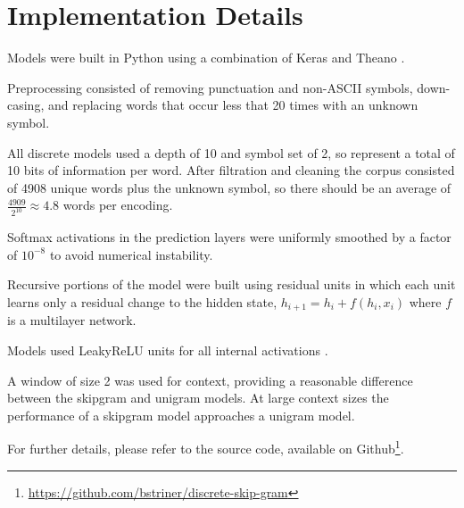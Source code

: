 \documentclass[sigconf]{acmart}
\begin{document}
\section{Implementation Details}

Models were built in Python using a combination of Keras \cite{chollet2015keras} and Theano \cite{2016arXiv160502688short}.

Preprocessing consisted of removing punctuation and non-ASCII symbols, down-casing, and replacing words that occur less that 20 times with an unknown symbol.

All discrete models used a depth of 10 and symbol set of 2, so represent a total of 10 bits of information per word. After filtration and cleaning the corpus consisted of 4908 unique words plus the unknown symbol, so there should be an average of $\frac{4909}{2^{10}} \approx 4.8$ words per encoding.

Softmax activations in the prediction layers were uniformly smoothed by a factor of $10^{-8}$ to avoid numerical instability.

Recursive portions of the model were built using residual units \cite{DBLP:journals/corr/HeZRS15} in which each unit learns only a residual change to the hidden state,
$h_{i+1} = h_i + f(h_i, x_i)$ where $f$ is a multilayer network.

Models used LeakyReLU units for all internal activations \cite{Maas2013} \cite{DBLP:journals/corr/XuWCL15}.

A window of size 2 was used for context, providing a reasonable difference between the skipgram and unigram models. At large context sizes the performance of a skipgram model approaches a unigram model.

For further details, please refer to the source code, available on Github\footnote{\url{https://github.com/bstriner/discrete-skip-gram}}.

\nocite{*}


 
\end{document}
